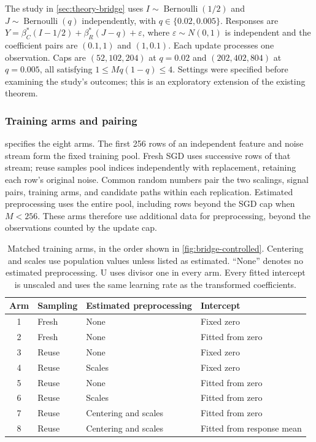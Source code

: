\documentclass{alt2027}
\begin{document}
The study in \cref{sec:theory-bridge} uses
$I \sim \operatorname{Bernoulli}(1/2)$ and $J \sim \operatorname{Bernoulli}(q)$
independently, with $q \in \{0.02,0.005\}$. Responses are
$Y = \beta_C^*(I - 1/2) + \beta_R^*(J - q) + \varepsilon$, where
$\varepsilon \sim N(0,1)$ is independent and the coefficient pairs are $(0.1,1)$
and $(1,0.1)$. Each update processes one observation. Caps are $(52,102,204)$ at
$q = 0.02$ and $(202,402,804)$ at $q = 0.005$, all satisfying
$1 \leq Mq(1 - q) \leq 4$. Settings were specified before examining the study's
outcomes; this is an exploratory extension of the existing theorem.

\subsubsection{Training arms and pairing}

 specifies the eight arms. The first 256 rows of an
independent feature and noise stream form the fixed training pool. Fresh SGD
uses successive rows of that stream; reuse samples pool indices independently
with replacement, retaining each row's original noise. Common random numbers
pair the two scalings, signal pairs, training arms, and candidate paths within
each replication. Estimated preprocessing uses the entire pool, including rows
beyond the SGD cap when $M < 256$. These arms therefore use additional data for
preprocessing, beyond the observations counted by the update cap.

\begin{table}[ht]
  \centering
  \small
  \begin{tabular}{clll}
    \toprule
    Arm & Sampling & Estimated preprocessing & Intercept                 \\
    \midrule
     1  & Fresh    & None                    & Fixed zero                \\
     2  & Fresh    & None                    & Fitted from zero          \\
     3  & Reuse    & None                    & Fixed zero                \\
     4  & Reuse    & Scales                  & Fixed zero                \\
     5  & Reuse    & None                    & Fitted from zero          \\
     6  & Reuse    & Scales                  & Fitted from zero          \\
     7  & Reuse    & Centering and scales    & Fitted from zero          \\
     8  & Reuse    & Centering and scales    & Fitted from response mean \\
    \bottomrule
  \end{tabular}
  \caption{
    Matched training arms, in the order shown in \cref{fig:bridge-controlled}.
    Centering and scales use population values unless listed as estimated.
    ``None'' denotes no estimated preprocessing. U uses divisor one in every
    arm. Every fitted intercept is unscaled and uses the same learning rate as
    the transformed coefficients.
  }
  \label{tab:bridge-arms}
\end{table}
\end{document}
